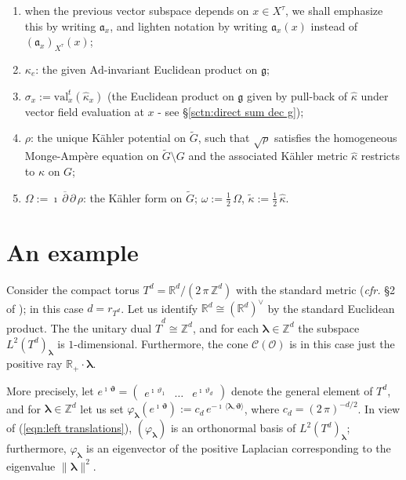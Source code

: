 \documentclass[12pt,a4paper]{article}
\theoremstyle{plain}
\theoremstyle{definition}
\begin{document}
\begin{enumerate}
\item when the previous vector subspace depends 
on $x\in X^\tau$, we shall emphasize this by writing 
$\mathfrak{a}_x$, and lighten notation by writing
$\mathfrak{a}_x(x)$ instead of $({\mathfrak{a}_x})_{X^\tau}(x)$;


\item $\kappa_e$: the given
$\mathrm{Ad}$-invariant Euclidean product on $\mathfrak{g}$; 


\item $\sigma_x:=\mathrm{val}_x^t(\hat{\kappa}_x)$ (the Euclidean product on $\mathfrak{g}$ given by pull-back
of $\hat{\kappa}$ under vector field evaluation at $x$
- see \S \ref{sctn:direct sum dec g});

\item $\rho$: the unique K\"{a}hler potential on $\tilde{G}$, such that
$\sqrt{\rho}$ satisfies the homogeneous Monge-Amp\`{e}re equation on
$\tilde{G}\setminus G$ and the associated K\"{a}hler metric $\hat{\kappa}$ restricts to $\kappa$ on $G$;

\item $\Omega:=\imath\,\overline{\partial}\,\partial\,\rho$: 
the K\"{a}hler form on $\tilde{G}$; 
$\omega:=\frac{1}{2}\,\Omega$, $\tilde{\kappa}:=\frac{1}{2}\,\hat{\kappa}$.




\end{enumerate}

\section{An example}

Consider the compact torus 
$T^d=\mathbb{R}^d/(2\,\pi\,\mathbb{Z}^d)$ with the standard metric (\textit{cfr.} \S 2 of \cite{p24});
in this case $d=r_{T^d}$. 
Let us identify $\mathbb{R}^d\cong (\mathbb{R}^d)^\vee$ by the
standard Euclidean product.
The the unitary dual $\hat{T}^d\cong \mathbb{Z}^d$, 
and for each $\boldsymbol{\lambda}\in \mathbb{Z}^d$ the subspace
$L^2(T^d)_{\boldsymbol{\lambda}}$ is $1$-dimensional.
Furthermore, the cone $\mathcal{C}(\mathcal{O})$ is in this case
just the positive ray $\mathbb{R}_+\cdot\boldsymbol{\lambda}$.

More precisely, let 
$e^{\imath\,\boldsymbol{\vartheta}}=\begin{pmatrix}
e^{\imath\,\vartheta_1}&\ldots&e^{\imath\,\vartheta_d}
\end{pmatrix}$
denote the general element of $T^d$, and for $\boldsymbol{\lambda}\in \mathbb{Z}^d$
let us set $\varphi_{\boldsymbol{\lambda}}
(e^{\imath\,\boldsymbol{\vartheta}})
:=c_d\,
e^{-\imath\,
\langle\boldsymbol{\lambda},\boldsymbol{\vartheta}
\rangle}$, where $c_d=(2\,\pi)^{-d/2}$.
In view of (\ref{eqn:left translations}), $(\varphi_{\boldsymbol{\lambda}})$ is an orthonormal basis  of $L^2(T^d)_{\boldsymbol{\lambda}}$;
furthermore,
$\varphi_{\boldsymbol{\lambda}}$
is an eigenvector of the positive 
Laplacian corresponding to the eigenvalue $\|\boldsymbol{\lambda}\|^2$.
 
\end{document}
